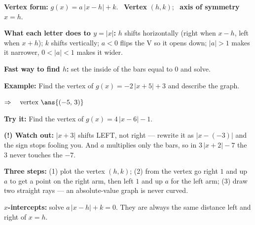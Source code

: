 \documentclass[12pt]{article}
\begin{document}


\begin{formulabox}
\textbf{Vertex form:} $g(x) = a\,|x - h| + k$. \ \textbf{Vertex} $(h, k)$; \ \textbf{axis of symmetry} $x = h$.\par
\textbf{What each letter does to $y = |x|$:} $h$ shifts horizontally (right when $x - h$, left when $x + h$); $k$ shifts vertically; $a < 0$ flips the V so it opens down; $|a| > 1$ makes it narrower, $0 < |a| < 1$ makes it wider.\par
\textbf{Fast way to find $h$:} set the inside of the bars equal to $0$ and solve.
\end{formulabox}

\begin{examplebox}
\textbf{Example:} \quad Find the vertex of $g(x) = -2\,|x + 5| + 3$ and describe the graph.

$\Rightarrow\quad \text{vertex } \ans{(-5,\,3)}$
\end{examplebox}

\begin{tryitbox}
\textbf{Try it:} \quad Find the vertex of $g(x) = 4\,|x - 6| - 1$.\\[2pt]
\end{tryitbox}

\begin{watchoutbox}
\textbf{(!) Watch out:} $|x + 3|$ shifts LEFT, not right --- rewrite it as $|x - (-3)|$ and the sign stops fooling you. And $a$ multiplies only the bars, so in $3\,|x + 2| - 7$ the $3$ never touches the $-7$.
\end{watchoutbox}


\begin{formulabox}
\textbf{Three steps:} (1) plot the vertex $(h, k)$; (2) from the vertex go right $1$ and up $a$ to get a point on the right arm, then left $1$ and up $a$ for the left arm; (3) draw two straight rays --- an absolute-value graph is never curved.\par
\textbf{$x$-intercepts:} solve $a\,|x - h| + k = 0$. They are always the same distance left and right of $x = h$.
\end{formulabox}
\end{document}
